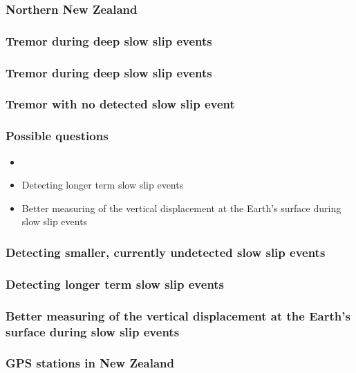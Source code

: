 \documentclass{beamer}
\begin{document}
	\begin{frame}
		\frametitle{Northern New Zealand}
	\end{frame}

	\begin{frame}
		\frametitle{Tremor during deep slow slip events}
	\end{frame}

	\begin{frame}
		\frametitle{Tremor during deep slow slip events}
	\end{frame}

	\begin{frame}
		\frametitle{Tremor with no detected slow slip event}
	\end{frame}

	\begin{frame}
		\frametitle{Possible questions}
		\begin{itemize}
			\item 
			\item Detecting longer term slow slip events
			\item Better measuring of the vertical displacement at the Earth’s surface during slow slip events
		\end{itemize}
	\end{frame}

	\begin{frame}
		\frametitle{Detecting smaller, currently undetected slow slip events}
	\end{frame}

	\begin{frame}
		\frametitle{Detecting longer term slow slip events}
	\end{frame}

	\begin{frame}
		\frametitle{Better measuring of the vertical displacement at the Earth’s surface during slow slip events}
	\end{frame}

	\begin{frame}
		\frametitle{GPS stations in New Zealand}
	\end{frame}
\end{document}
